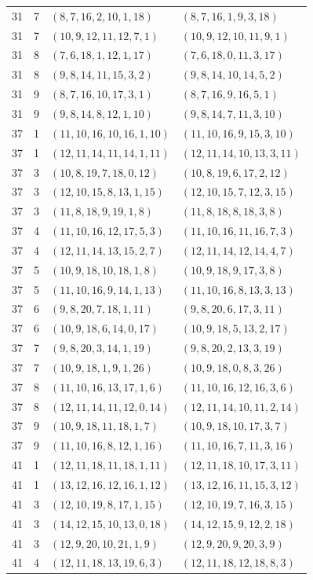 \begin{longtable}{rrll}
31&7&$(8,7,16,2,10,1,18)$&$(8,7,16,1,9,3,18)$\\
31&7&$(10,9,12,11,12,7,1)$&$(10,9,12,10,11,9,1)$\\
31&8&$(7,6,18,1,12,1,17)$&$(7,6,18,0,11,3,17)$\\
31&8&$(9,8,14,11,15,3,2)$&$(9,8,14,10,14,5,2)$\\
31&9&$(8,7,16,10,17,3,1)$&$(8,7,16,9,16,5,1)$\\
31&9&$(9,8,14,8,12,1,10)$&$(9,8,14,7,11,3,10)$\\
37&1&$(11,10,16,10,16,1,10)$&$(11,10,16,9,15,3,10)$\\
37&1&$(12,11,14,11,14,1,11)$&$(12,11,14,10,13,3,11)$\\
37&3&$(10,8,19,7,18,0,12)$&$(10,8,19,6,17,2,12)$\\
37&3&$(12,10,15,8,13,1,15)$&$(12,10,15,7,12,3,15)$\\
37&3&$(11,8,18,9,19,1,8)$&$(11,8,18,8,18,3,8)$\\
37&4&$(11,10,16,12,17,5,3)$&$(11,10,16,11,16,7,3)$\\
37&4&$(12,11,14,13,15,2,7)$&$(12,11,14,12,14,4,7)$\\
37&5&$(10,9,18,10,18,1,8)$&$(10,9,18,9,17,3,8)$\\
37&5&$(11,10,16,9,14,1,13)$&$(11,10,16,8,13,3,13)$\\
37&6&$(9,8,20,7,18,1,11)$&$(9,8,20,6,17,3,11)$\\
37&6&$(10,9,18,6,14,0,17)$&$(10,9,18,5,13,2,17)$\\
37&7&$(9,8,20,3,14,1,19)$&$(9,8,20,2,13,3,19)$\\
37&7&$(10,9,18,1,9,1,26)$&$(10,9,18,0,8,3,26)$\\
37&8&$(11,10,16,13,17,1,6)$&$(11,10,16,12,16,3,6)$\\
37&8&$(12,11,14,11,12,0,14)$&$(12,11,14,10,11,2,14)$\\
37&9&$(10,9,18,11,18,1,7)$&$(10,9,18,10,17,3,7)$\\
37&9&$(11,10,16,8,12,1,16)$&$(11,10,16,7,11,3,16)$\\
41&1&$(12,11,18,11,18,1,11)$&$(12,11,18,10,17,3,11)$\\
41&1&$(13,12,16,12,16,1,12)$&$(13,12,16,11,15,3,12)$\\
41&3&$(12,10,19,8,17,1,15)$&$(12,10,19,7,16,3,15)$\\
41&3&$(14,12,15,10,13,0,18)$&$(14,12,15,9,12,2,18)$\\
41&3&$(12,9,20,10,21,1,9)$&$(12,9,20,9,20,3,9)$\\
41&4&$(12,11,18,13,19,6,3)$&$(12,11,18,12,18,8,3)$\\

\end{longtable}
